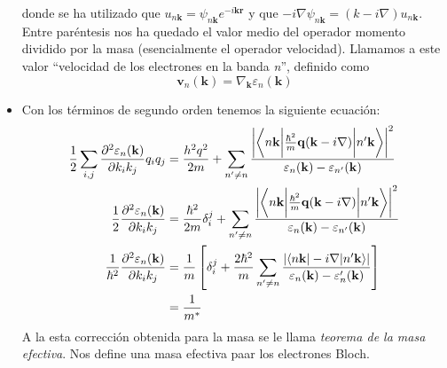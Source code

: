 \begin{itemize}
donde se ha utilizado que $u_{n \mathbf{k}} = \psi_{n \mathbf{k}}
e^{-i \mathbf{k} \mathbf{r}}$ y que $-i \nabla \psi_{n \mathbf{k}} = (k -
i\nabla)u_{n \mathbf{k}}$.
Entre paréntesis nos ha quedado el valor medio del operador momento
dividido por la masa (esencialmente el operador velocidad). Llamamos a
este valor ``velocidad de los electrones en la banda \emph{n}'',
definido como
\begin{equation}
  \boxed{
  \mathbf{v}_n(\mathbf{k}) = \nabla_\mathbf{k} \varepsilon_n
  (\mathbf{k})
}
\end{equation}
\item Con los términos de segundo orden tenemos la siguiente ecuación:
\begin{equation}
  \begin{split}
    \frac{1}{2} \sum_{i,j}  \frac{\partial ^2 \varepsilon_n
    (\mathbf{k})}{\partial k_i k_j} q_i q_j &=\frac{h^2q^2}{2m}
                                     + \sum_{n' \neq n} \frac{ \bigg| \bigg\langle n \mathbf{k}\bigg|
                                     \frac{\hbar^2}{m} \mathbf{q} (\mathbf{k} -i \nabla) \bigg| n'
                                     \mathbf{k} \bigg\rangle \bigg|^2 }{\varepsilon_n (\mathbf{k}) -
                                     \varepsilon_{n'}(\mathbf{k})} \\
    \frac{1}{2} \frac{\partial ^2 \varepsilon_n(\mathbf{k})}{\partial k_i k_j} &=
                                                                \frac{\hbar^2}{2m}
                                                                \delta_i^j
                                                                + \sum_{n' \neq n} \frac{ \bigg| \bigg\langle n \mathbf{k}\bigg|
                                                                \frac{\hbar^2}{m} \mathbf{q} (\mathbf{k} -i \nabla) \bigg| n'
                                                                \mathbf{k} \bigg\rangle \bigg|^2 }{\varepsilon_n (\mathbf{k}) -
                                                                \varepsilon_{n'}(\mathbf{k})}
    \\
\frac{1}{\hbar^2} \frac{\partial ^2 \varepsilon_n (\mathbf{k})}{\partial k_i k_j} &=
    \frac{1}{m} \left[ \delta_i^j + \frac{2 \hbar^2}{m} \sum_{n'\neq
    n} \frac{|\langle n \mathbf{k} | -i \nabla | n' \mathbf{k}\rangle|}{\varepsilon_n (\mathbf{k} )-
    \varepsilon_n' (\mathbf{k})} \right] \\
&= \frac{1}{m^*}
  \end{split}
\end{equation}
A la esta corrección obtenida para la masa se le llama \emph{teorema
  de la masa efectiva}. Nos define una masa efectiva paar los
electrones Bloch.
\end{itemize}

